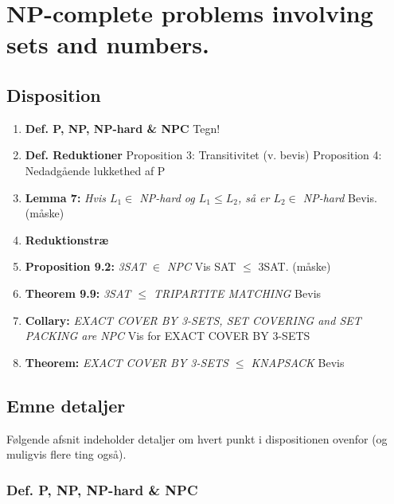 \section{NP-complete problems involving sets and numbers.}

\subsection{Disposition}

\begin{enumerate}
 \item \textbf{Def. P, NP, NP-hard \& NPC}
    \subitem  Tegn!
 \item \textbf{Def. Reduktioner}
    \subitem  Proposition 3: Transitivitet (v. bevis)
    \subitem  Proposition 4: Nedadgående lukkethed af P  
 \item \textbf{Lemma 7:} \textit{Hvis $L_1 \in$ NP-hard og $L_1 \leq L_2$, så er $L_2 \in$ NP-hard}
    \subitem  Bevis. (måske)
 \item \textbf{Reduktionstræ}
 \item \textbf{Proposition 9.2:} \textit{3SAT $\in$ NPC}
    \subitem Vis SAT $\leq$ 3SAT. (måske)
 \item \textbf{Theorem 9.9:} \textit{3SAT $\leq$ TRIPARTITE MATCHING}
    \subitem Bevis
 \item \textbf{Collary:} \textit{EXACT COVER BY 3-SETS, SET COVERING and SET PACKING are NPC}
    \subitem Vis for EXACT COVER BY 3-SETS
 \item \textbf{Theorem:} \textit{EXACT COVER BY 3-SETS $\leq$ KNAPSACK}
    \subitem Bevis
\end{enumerate}

\subsection{Emne detaljer}

Følgende afsnit indeholder detaljer om hvert punkt i dispositionen ovenfor (og muligvis flere ting også).

\subsubsection{Def. P, NP, NP-hard \& NPC}


